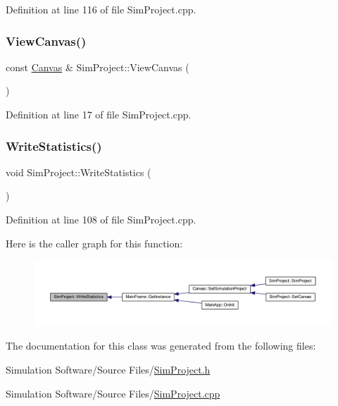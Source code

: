 Definition at line 116 of file Sim\+Project.\+cpp.

\mbox{\label{class_sim_project_ac37baac3398294b75d77892397871cc9}} 
\subsubsection{\texorpdfstring{View\+Canvas()}{ViewCanvas()}}
{\footnotesize\ttfamily const \hyperlink{class_canvas}{Canvas} \& Sim\+Project\+::\+View\+Canvas (\begin{DoxyParamCaption}{ }\end{DoxyParamCaption})}



Definition at line 17 of file Sim\+Project.\+cpp.

\mbox{\label{class_sim_project_a1d85585bc3e52f1dc389612abc0f449e}} 
\subsubsection{\texorpdfstring{Write\+Statistics()}{WriteStatistics()}}
{\footnotesize\ttfamily void Sim\+Project\+::\+Write\+Statistics (\begin{DoxyParamCaption}{ }\end{DoxyParamCaption})}



Definition at line 108 of file Sim\+Project.\+cpp.

Here is the caller graph for this function\+:
\nopagebreak
\begin{figure}[H]
\begin{center}
\leavevmode
\includegraphics[width=350pt]{class_sim_project_a1d85585bc3e52f1dc389612abc0f449e_icgraph}
\end{center}
\end{figure}


The documentation for this class was generated from the following files\+:\begin{DoxyCompactItemize}
\item 
Simulation Software/\+Source Files/\hyperlink{_sim_project_8h}{Sim\+Project.\+h}\item 
Simulation Software/\+Source Files/\hyperlink{_sim_project_8cpp}{Sim\+Project.\+cpp}\end{DoxyCompactItemize}
